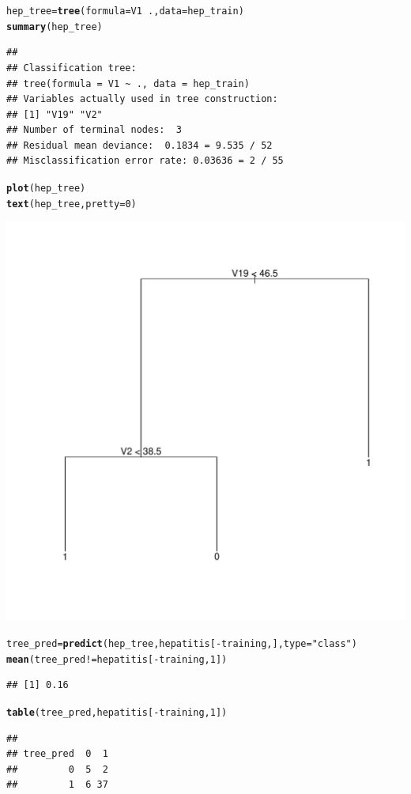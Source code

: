 \documentclass{article}\usepackage[]{graphicx}\usepackage[]{color}
\makeatletter
\newcommand{\hlnum}[1]{\textcolor[rgb]{0.686,0.059,0.569}{#1}}%
\newcommand{\hlstr}[1]{\textcolor[rgb]{0.192,0.494,0.8}{#1}}%
\newcommand{\hlopt}[1]{\textcolor[rgb]{0,0,0}{#1}}%
\newcommand{\hlstd}[1]{\textcolor[rgb]{0.345,0.345,0.345}{#1}}%
\newcommand{\hlkwb}[1]{\textcolor[rgb]{0.69,0.353,0.396}{#1}}%
\newcommand{\hlkwc}[1]{\textcolor[rgb]{0.333,0.667,0.333}{#1}}%
\newcommand{\hlkwd}[1]{\textcolor[rgb]{0.737,0.353,0.396}{\textbf{#1}}}%
\newenvironment{kframe}{%
 \def\at@end@of@kframe{}%
 \ifinner\ifhmode%
  \def\at@end@of@kframe{\end{minipage}}%
  \begin{minipage}{\columnwidth}%
 \fi\fi%
 \def\FrameCommand##1{\hskip\@totalleftmargin \hskip-\fboxsep
 \colorbox{shadecolor}{##1}\hskip-\fboxsep
     \hskip-\linewidth \hskip-\@totalleftmargin \hskip\columnwidth}%
 \MakeFramed {\advance\hsize-\width
   \@totalleftmargin\z@ \linewidth\hsize
   \@setminipage}}%
 {\par\unskip\endMakeFramed%
 \at@end@of@kframe}
\newenvironment{knitrout}{}{} %
\makeatother
\begin{document}
\begin{knitrout}
\color{fgcolor}\begin{kframe}
\begin{alltt}
\hlstd{hep_tree} \hlkwb{=} \hlkwd{tree}\hlstd{(}\hlkwc{formula} \hlstd{= V1} \hlopt{~} \hlstd{.,} \hlkwc{data} \hlstd{= hep_train)}
\hlkwd{summary}\hlstd{(hep_tree)}
\end{alltt}
\begin{verbatim}
## 
## Classification tree:
## tree(formula = V1 ~ ., data = hep_train)
## Variables actually used in tree construction:
## [1] "V19" "V2" 
## Number of terminal nodes:  3 
## Residual mean deviance:  0.1834 = 9.535 / 52 
## Misclassification error rate: 0.03636 = 2 / 55
\end{verbatim}
\begin{alltt}
\hlkwd{plot}\hlstd{(hep_tree)}
\hlkwd{text}\hlstd{(hep_tree ,}\hlkwc{pretty} \hlstd{=}\hlnum{0}\hlstd{)}
\end{alltt}
\end{kframe}
\includegraphics[width=0.40\linewidth]{figure/unnamed-chunk-12-1} 
\begin{kframe}\begin{alltt}
\hlstd{tree_pred} \hlkwb{=} \hlkwd{predict}\hlstd{(hep_tree, hepatitis[}\hlopt{-}\hlstd{training,],} \hlkwc{type} \hlstd{=} \hlstr{"class"}\hlstd{)}
\hlkwd{mean}\hlstd{(tree_pred} \hlopt{!=} \hlstd{hepatitis[}\hlopt{-}\hlstd{training,}\hlnum{1}\hlstd{])}
\end{alltt}
\begin{verbatim}
## [1] 0.16
\end{verbatim}
\begin{alltt}
\hlkwd{table}\hlstd{(tree_pred, hepatitis[}\hlopt{-}\hlstd{training,}\hlnum{1}\hlstd{])}
\end{alltt}
\begin{verbatim}
##          
## tree_pred  0  1
##         0  5  2
##         1  6 37
\end{verbatim}
\end{kframe}
\end{knitrout}
\end{document}

